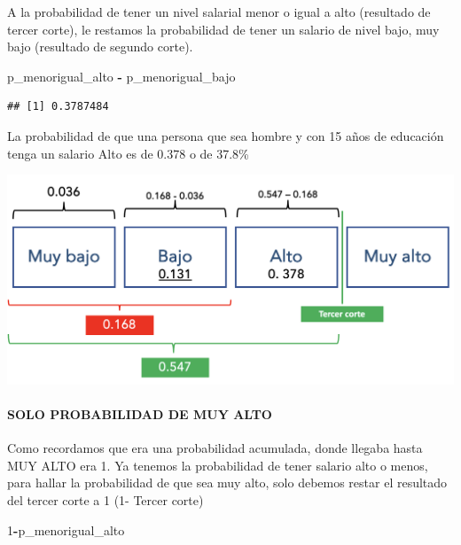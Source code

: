 \documentclass[
]{article}
\newenvironment{Shaded}{\begin{snugshade}}{\end{snugshade}}
\newcommand{\DecValTok}[1]{\textcolor[rgb]{0.00,0.00,0.81}{#1}}
\newcommand{\NormalTok}[1]{#1}
\newcommand{\SpecialCharTok}[1]{\textcolor[rgb]{0.81,0.36,0.00}{\textbf{#1}}}
\begin{document}
A la probabilidad de tener un nivel salarial menor o igual a alto
(resultado de tercer corte), le restamos la probabilidad de tener un
salario de nivel bajo, muy bajo (resultado de segundo corte).

\begin{Shaded}
\begin{Highlighting}[]
\NormalTok{p\_menorigual\_alto }\SpecialCharTok{{-}}\NormalTok{ p\_menorigual\_bajo}
\end{Highlighting}
\end{Shaded}

\begin{verbatim}
## [1] 0.3787484
\end{verbatim}

La probabilidad de que una persona que sea hombre y con 15 años de
educación tenga un salario Alto es de 0.378 o de 37.8\%

\begin{center}\includegraphics[width=0.8\linewidth]{pd5_corte3} \end{center}

\hypertarget{solo-probabilidad-de-muy-alto}{%
\paragraph{SOLO PROBABILIDAD DE MUY
ALTO}\label{solo-probabilidad-de-muy-alto}}

Como recordamos que era una probabilidad acumulada, donde llegaba hasta
MUY ALTO era 1. Ya tenemos la probabilidad de tener salario alto o
menos, para hallar la probabilidad de que sea muy alto, solo debemos
restar el resultado del tercer corte a 1 (1- Tercer corte)

\begin{Shaded}
\begin{Highlighting}[]
\DecValTok{1}\SpecialCharTok{{-}}\NormalTok{p\_menorigual\_alto}
\end{Highlighting}
\end{Shaded}
\end{document}
